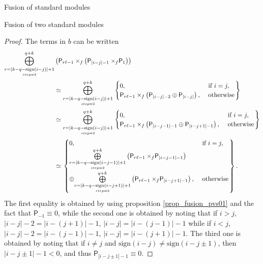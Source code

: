 \documentclass[reqno]{amsart}
\newcommand{\dP}[1]{\mathsf P_{#1}}
\newcommand{\xf}{\times\hspace{-0.27em}_f}
\newcommand{\lc}{\ell}
\begin{document}
\begin{section}{Fusion of standard modules}
\begin{subsection}{Fusion of two standard modules}
\begin{proof}
The terms in $b$ can be written
\begin{align}
	\overset{q+k}{\underset{\underset{step =2}{r = |k-q-\text{sign}(i-j)| + 1}}{\bigoplus}}&\left(\dP{r \lc -1} \xf \left(\dP{|i-j|-1} \xf \dP{1} \right) \right) \notag\\
	&\simeq \overset{q+k}{\underset{\underset{step =2}{r = |k-q-\text{sign}(i-j)| + 1}}{\bigoplus}}\left.
	\begin{cases}	
	0, & \text{ if } i=j,\\
	\dP{r \lc -1} \xf \left(\dP{|i-j|-2} \oplus \dP{|i-j|}\right), & \text{ otherwise}
	\end{cases}\right\rbrace \notag \\
	& \simeq \overset{q+k}{\underset{\underset{step =2}{r = |k-q-\text{sign}(i-j)| + 1}}{\bigoplus}}\left.
	\begin{cases}	
	0, & \text{ if } i=j,\\
	\dP{r \lc -1} \xf \left(\dP{|i-j-1|-1} \oplus \dP{|i-j+1|-1}\right), & \text{ otherwise}
	\end{cases}\right\rbrace \notag\\
	& \simeq \left. \begin{cases}
	0, & \text{ if } i=j,\\
	 \overset{q+k}{\underset{\underset{step =2}{r = |k-q-\text{sign}(i-j-1)| + 1}}{\bigoplus}}\left(\dP{r \lc -1} \xf \dP{|i-j-1|-1} \right) &\\
	  \oplus \overset{q+k}{\underset{\underset{step =2}{r = |k-q-\text{sign}(i-j+1)| + 1}}{\bigoplus}}\left(\dP{r \lc -1} \xf \dP{|i-j+1|-1} \right),& \text{ otherwise}
	 \end{cases}\right\rbrace .
\end{align}
The first equality is obtained by using proposition \ref{prop_fusion_pvs01} and the fact that $\dP{-1} \equiv 0$, while the second one is obtained by noting that if $i>j$, $|i-j| -2 = |i - (j+1)| -1$, $|i-j| = |i-(j-1)|-1$ while if $i<j$, $|i-j|-2 = |i-(j-1)|-1$, $|i-j| = |i - (j+1)|-1$. The third one is obtained by noting that if $i \neq j$ and $\text{sign}(i-j) \neq \text{sign}(i-j \pm 1)$, then $|i-j \pm 1| -1 < 0$, and thus $\dP{|i-j \pm 1| -1} \equiv 0$.


\end{proof}
\end{subsection}
\end{section}
\end{document}

